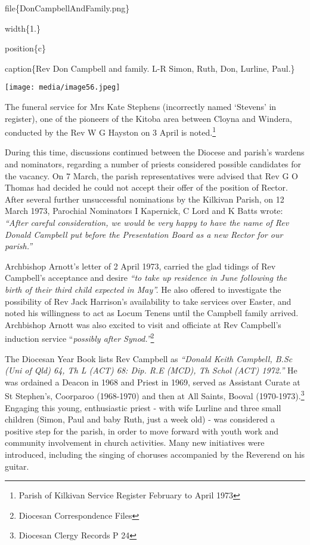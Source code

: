 file\{DonCampbellAndFamily.png\}

width\{1.\}

position\{c\}

caption\{Rev Don Campbell and family. L-R Simon, Ruth, Don, Lurline, Paul.\}

\texttt{[image: media/image56.jpeg]}

The funeral service for Mrs Kate Stephens (incorrectly named `Stevens' in register), one of the pioneers of the Kitoba area between Cloyna and Windera, conducted by the Rev W G Hayston on 3 April is noted.\footnote{Parish of Kilkivan Service Register February to April 1973}

During this time, discussions continued between the Diocese and parish's wardens and nominators, regarding a number of priests considered possible candidates for the vacancy. On 7 March, the parish representatives were advised that Rev G O Thomas had decided he could not accept their offer of the position of Rector. After several further unsuccessful nominations by the Kilkivan Parish, on 12 March 1973, Parochial Nominators I Kapernick, C Lord and K Batts wrote: \emph{``After careful consideration, we would be very happy to have the name of Rev Donald Campbell put before the Presentation Board as a new Rector for our parish.''}

Archbishop Arnott's letter of 2 April 1973, carried the glad tidings of Rev Campbell's acceptance and desire \emph{``to take up residence in June following the birth of their third child expected in May''.} He also offered to investigate the possibility of Rev Jack Harrison's availability to take services over Easter, and noted his willingness to act as Locum Tenens until the Campbell family arrived. Archbishop Arnott was also excited to visit and officiate at Rev Campbell's induction service ``\emph{possibly after Synod.''}\footnote{Diocesan Correspondence Files}

The Diocesan Year Book lists Rev Campbell as \emph{``Donald Keith Campbell, B.Sc (Uni of Qld) 64, Th L (ACT) 68: Dip. R.E (MCD), Th Schol (ACT) 1972.''} He was ordained a Deacon in 1968 and Priest in 1969, served as Assistant Curate at St Stephen's, Coorparoo (1968-1970) and then at All Saints, Booval (1970-1973).\footnote{Diocesan Clergy Records P 24} Engaging this young, enthusiastic priest - with wife Lurline and three small children (Simon, Paul and baby Ruth, just a week old) - was considered a positive step for the parish, in order to move forward with youth work and community involvement in church activities. Many new initiatives were introduced, including the singing of choruses accompanied by the Reverend on his guitar.

